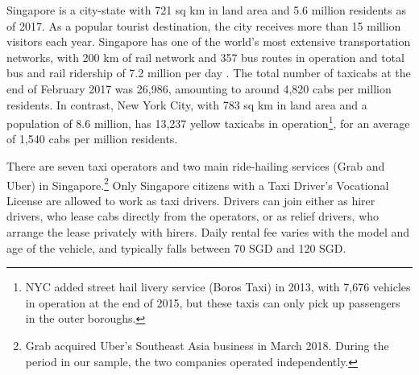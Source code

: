 \documentclass[reviewmode]{restud}
\begin{document}
Singapore is a city-state with 721 sq km in land area and 5.6 million residents as of 2017. As a popular tourist destination, the city receives more than 15 million visitors each year.
Singapore has one of the world's most extensive transportation networks, with 200 km of rail network and
357 bus routes in operation
and total bus and rail ridership of 7.2 million per day%
.
The total number of taxicabs at the end of February 2017 was 26,986, amounting to around 4,820 cabs per million residents. In contrast, New York City, with 783 sq km in land area and a population of 8.6 million, has 13,237 yellow taxicabs in operation\footnote{NYC added street hail livery service (Boros Taxi) in 2013, with 7,676 vehicles in operation at the end of 2015, but these taxis can only pick up passengers in the outer boroughs.}, for an average of 1,540 cabs per million residents.

There are seven taxi operators 
and two main ride-hailing services (Grab and Uber) in Singapore.\footnote{Grab acquired Uber's Southeast Asia business in March 2018. %
During the period in our sample, the two companies operated independently.} Only Singapore citizens with a Taxi Driver's Vocational License are allowed to work as taxi drivers. Drivers can join either as hirer drivers, who lease cabs directly from the operators, or as relief drivers, who arrange the lease privately with hirers. Daily rental fee varies with the model and age of the vehicle, and typically falls between 70 SGD and 120 SGD.
\end{document}
